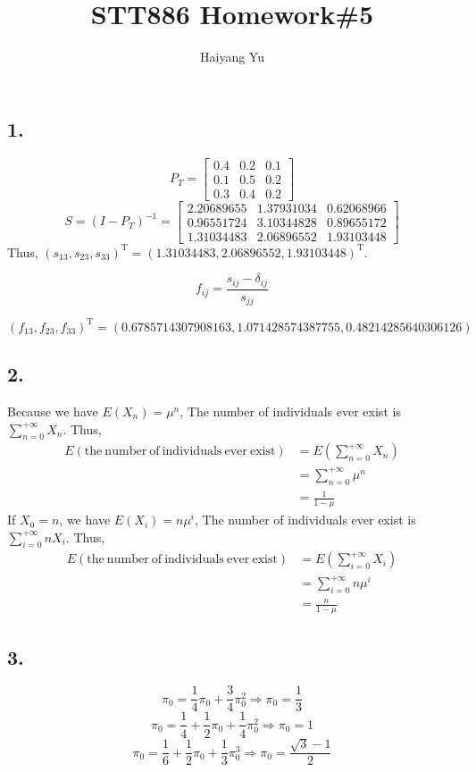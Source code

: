 \documentclass{article}
\title{STT886 Homework\#5}
\author{Haiyang Yu}
\begin{document}
\maketitle
\subsection*{1.}
$$P_{T}=
 \left[
 \begin{matrix}
   0.4 & 0.2 & 0.1 \\
   0.1 & 0.5 & 0.2 \\
   0.3 & 0.4 & 0.2
  \end{matrix}
  \right]
$$
$$S=(I-P_{T})^{-1}=
\left[
\begin{matrix}
2.20689655 &1.37931034& 0.62068966\\
0.96551724 &3.10344828 &0.89655172\\
1.31034483 &2.06896552 &1.93103448
\end{matrix}
\right]
$$
Thus, $(s_{13},s_{23},s_{33})^{\mathrm{T}}=(1.31034483, 2.06896552, 1.93103448)^{\mathrm{T}}$.

$$f_{ij}=\frac{s_{ij}-\delta_{ij}}{s_{jj}}$$

$(f_{13},f_{23},f_{33})^{\mathrm{T}}=(0.6785714307908163, 1.071428574387755, 0.48214285640306126)$
\subsection*{2.}
Because we have $E(X_{n})=\mu^{n}$, The number of individuals ever exist is $\sum_{n=0}^{+\infty}X_{n}$. Thus, 
\begin{align*}
E(\mathrm{the\ number\ of\ individuals\ ever\ exist})&=E(\sum_{n=0}^{+\infty}X_{n})\\
&=\sum_{n=0}^{+\infty}\mu^{n}\\
&=\frac{1}{1-\mu}
\end{align*}
If $X_{0}=n$, we have $E(X_{i})=n\mu^{i}$, The number of individuals ever exist is $\sum_{i=0}^{+\infty}nX_{i}$. Thus,
\begin{align*}
E(\mathrm{the\ number\ of\ individuals\ ever\ exist})&=E(\sum_{i=0}^{+\infty}X_{i})\\
&=\sum_{i=0}^{+\infty}n\mu^{i}\\
&=\frac{n}{1-\mu}
\end{align*}
\subsection*{3.}
$$\pi_{0}=\frac{1}{4}\pi_{0}+\frac{3}{4}\pi_{0}^{2}\Rightarrow \pi_{0}=\frac{1}{3}$$
$$\pi_{0}=\frac{1}{4}+\frac{1}{2}\pi_{0}+\frac{1}{4}\pi_{0}^{2}\Rightarrow \pi_{0}=1$$
$$\pi_{0}=\frac{1}{6}+\frac{1}{2}\pi_{0}+\frac{1}{3}\pi_{0}^{3}\Rightarrow \pi_{0}=\frac{\sqrt{3}-1}{2}$$
\end{document}
